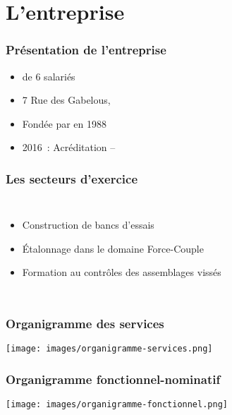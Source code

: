\section{L'entreprise}

\begin{frame} 
    \frametitle{Présentation de l'entreprise}
    {\LARGE\auto}
    \begin{itemize}
        \item<2->  de 6 salariés
        \item<2-> 7 Rue des Gabelous, 
        \item<2-> Fondée par  en 1988
        \item<3-> 2016~: Acréditation  -- 
    \end{itemize}
\end{frame}

\begin{frame}
    \frametitle{Les secteurs d'exercice}
    \begin{columns}
        \begin{itemize}
            \item<2-> \alert<2>{Construction de bancs d'essais}
            \item<3-> \alert<3>{Étalonnage dans le domaine Force-Couple}
            \item<4-> \alert<4>{Formation au contrôles des assemblages vissés}
        \end{itemize}

    \end{columns}
\end{frame}

\begin{frame}
    \frametitle{Organigramme des services}
    \texttt{[image: images/organigramme-services.png]}
\end{frame}

\begin{frame} \transwipe[duration=0.5]
    \frametitle{Organigramme fonctionnel-nominatif}
    \texttt{[image: images/organigramme-fonctionnel.png]}
\end{frame}

